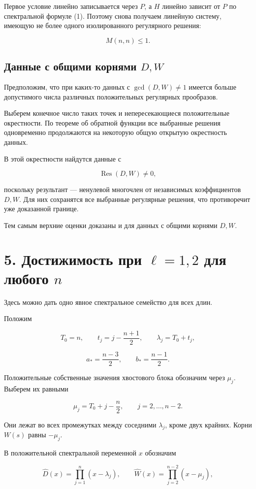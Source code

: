 \documentclass[11pt,a4paper]{article}
\begin{document}
Первое условие линейно записывается через \(P\), а \(H\) линейно зависит от \(P\) по спектральной формуле (1). Поэтому снова получаем линейную систему, имеющую не более одного изолированного регулярного решения:

\[
M(n,n)\le1.
\]

\subsection*{Данные с общими корнями \(D,W\)}

Предположим, что при каких-то данных с \(\gcd(D,W)\ne1\) имеется больше допустимого числа различных положительных регулярных прообразов.

Выберем конечное число таких точек и непересекающиеся положительные окрестности. По теореме об обратной функции все выбранные решения одновременно продолжаются на некоторую общую открытую окрестность данных.

В этой окрестности найдутся данные с

\[
\operatorname{Res}(D,W)\ne0,
\]

поскольку результант — ненулевой многочлен от независимых коэффициентов \(D,W\). Для них сохранятся все выбранные регулярные решения, что противоречит уже доказанной границе.

Тем самым верхние оценки доказаны и для данных с общими корнями \(D,W\).

\section*{\color{ink} 5. Достижимость при \(\ell=1,2\) для любого \(n\)}

Здесь можно дать одно явное спектральное семейство для всех длин.

Положим

\[
T_0=n,\qquad
t_j=j-\frac{n+1}{2},\qquad
\lambda_j=T_0+t_j,
\]

\[
a_*=\frac{n-3}{2},\qquad
b_*=\frac{n-1}{2}.
\]

Положительные собственные значения хвостового блока обозначим через \(\mu_j\). Выберем их равными

\[
\mu_j=T_0+j-\frac n2,\qquad j=2,\ldots,n-2.
\]

Они лежат во всех промежутках между соседними \(\lambda_j\), кроме двух крайних. Корни \(W(s)\) равны \(-\mu_j\).

В положительной спектральной переменной \(x\) обозначим

\[
\widehat D(x)=\prod_{j=1}^n(x-\lambda_j),\qquad
\widehat W(x)=\prod_{j=2}^{n-2}(x-\mu_j),
\]
\end{document}
